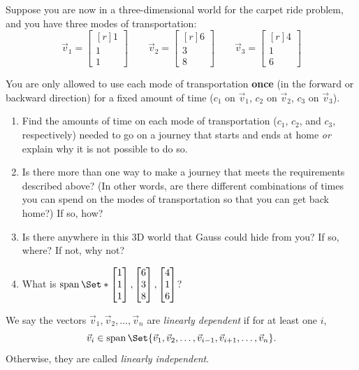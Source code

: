 \documentclass{problemset}
\DeclareMathOperator{\Span}{span}
\newcommand{\mat}[1]{\begin{bmatrix*}[r]#1\end{bmatrix*}}
\begin{document}
Suppose you are now in a three-dimensional world for the carpet
ride problem, and you have three modes of transportation:
\[
	\vec v_1 = \mat{1 \\1 \\ 1}\qquad
	\vec v_2 = \mat{6 \\3 \\ 8}\qquad
	\vec v_3 = \mat{4 \\1 \\ 6}
\]

You are only allowed to use each mode of transportation \textbf{once}
(in the forward or backward direction) for a fixed amount of time ($c_1$
on $\vec v_1$, $c_2$ on $\vec v_2$, $c_3$ on $\vec v_3$).

\vspace{5mm}


\begin{enumerate}
	\item  Find the amounts of time on each mode of transportation ($c_1$, $c_2$, 
		and $c_3$, respectively) needed to go on a journey that starts and ends 
		at home \emph{or} explain why it is not possible to do so.

	\item Is there more than one way to make a journey that meets the
		requirements described above? (In other words, are there different
		combinations of times you can spend on the modes of transportation so
		that you can get back home?) If so, how?

	\item Is there anywhere in this 3D world that Gauss
		could hide from you? If so, where? If not, why not?

	\item What is $\Span\Set*{\mat{1\\1\\1},\mat{6\\3\\8},\mat{4\\1\\6}}$?

\end{enumerate}


\newpage
\pagestyle{siefken}

	\newpage
	\begin{definition}
		We say the vectors $\vec v_1,\vec v_2,\ldots,\vec v_n$ are
		\emph{linearly dependent} if for at least one $i$,
		\[
			\vec v_i\in\Span\Set{\vec v_1,\vec v_2,\ldots,\vec v_{i-1},
			\vec v_{i+1},\ldots,\vec v_n}.
		\]
		Otherwise, they are called \emph{linearly independent}.
	\end{definition}
\end{document}
